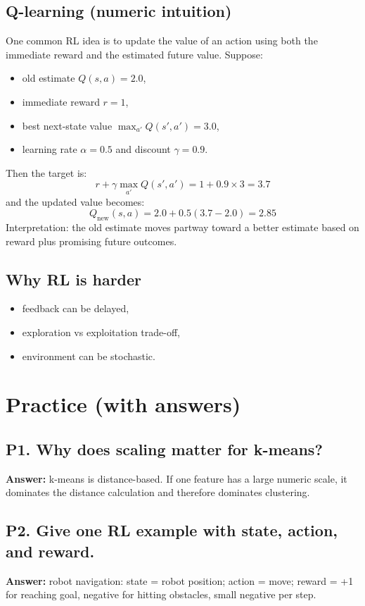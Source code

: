 \documentclass[11pt]{article}
\begin{document}
\subsection{Q-learning (numeric intuition)}
One common RL idea is to update the value of an action using both the immediate reward and the estimated future value.
Suppose:
\begin{itemize}[leftmargin=*]
  \item old estimate $Q(s,a)=2.0$,
  \item immediate reward $r=1$,
  \item best next-state value $\max_{a'}Q(s',a')=3.0$,
  \item learning rate $\alpha=0.5$ and discount $\gamma=0.9$.
\end{itemize}
Then the target is:
\[
  r + \gamma \max_{a'}Q(s',a') = 1 + 0.9 \times 3 = 3.7
\]
and the updated value becomes:
\[
  Q_{\text{new}}(s,a) = 2.0 + 0.5(3.7 - 2.0) = 2.85
\]
Interpretation: the old estimate moves partway toward a better estimate based on reward plus promising future outcomes.

\subsection{Why RL is harder}
\begin{itemize}[leftmargin=*]
  \item feedback can be delayed,
  \item exploration vs exploitation trade-off,
  \item environment can be stochastic.
\end{itemize}

\section{Practice (with answers)}
\subsection*{P1. Why does scaling matter for k-means?}
\textbf{Answer:} k-means is distance-based. If one feature has a large numeric scale, it dominates the distance calculation and therefore dominates clustering.

\subsection*{P2. Give one RL example with state, action, and reward.}
\textbf{Answer:} robot navigation: state = robot position; action = move; reward = +1 for reaching goal, negative for hitting obstacles, small negative per step.
\end{document}
